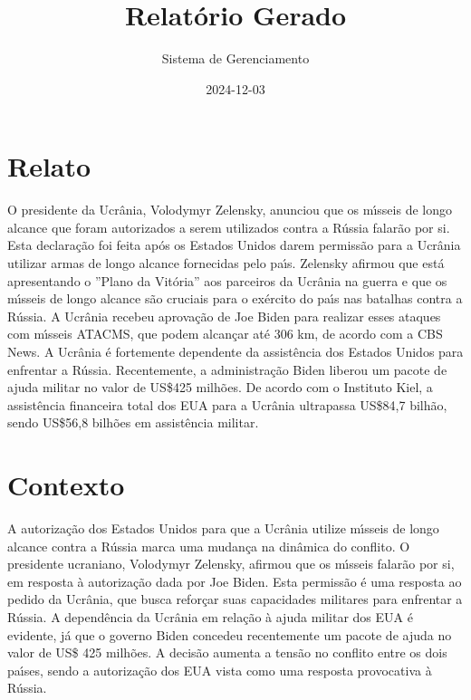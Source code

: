 \documentclass[article,11pt,oneside,a4paper,brazil,sumario=tradicional]{abntex2}%
\title{Relatório Gerado}%
\author{Sistema de Gerenciamento}%
\date{2024{-}12{-}03}%
\begin{document}
%
\normalsize%
\maketitle%
%
\frenchspacing%
\section{Relato}%
\label{sec:Relato}%
O presidente da Ucr\^ania, Volodymyr Zelensky, anunciou que os m{\'\i}sseis de longo alcance que foram autorizados a serem utilizados contra a R\'ussia falar\~ao por si. Esta declara\c{c}\~ao foi feita ap\'os os Estados Unidos darem permiss\~ao para a Ucr\^ania utilizar armas de longo alcance fornecidas pelo pa{\'\i}s. Zelensky afirmou que est\'a apresentando o ''Plano da Vit\'oria'' aos parceiros da Ucr\^ania na guerra e que os m{\'\i}sseis de longo alcance s\~ao cruciais para o ex\'ercito do pa{\'\i}s nas batalhas contra a R\'ussia. A Ucr\^ania recebeu aprova\c{c}\~ao de Joe Biden para realizar esses ataques com m{\'\i}sseis ATACMS, que podem alcan\c{c}ar at\'e 306 km, de acordo com a CBS News. A Ucr\^ania \'e fortemente dependente da assist\^encia dos Estados Unidos para enfrentar a R\'ussia. Recentemente, a administra\c{c}\~ao Biden liberou um pacote de ajuda militar no valor de US\$425 milh\~oes. De acordo com o Instituto Kiel, a assist\^encia financeira total dos EUA para a Ucr\^ania ultrapassa US\$84,7 bilh\~ao, sendo US\$56,8 bilh\~oes em assist\^encia militar.

%
\section{Contexto}%
\label{sec:Contexto}%
A autoriza\c{c}\~ao dos Estados Unidos para que a Ucr\^ania utilize m{\'\i}sseis de longo alcance contra a R\'ussia marca uma mudan\c{c}a na din\^amica do conflito. O presidente ucraniano, Volodymyr Zelensky, afirmou que os m{\'\i}sseis falar\~ao por si, em resposta \`a autoriza\c{c}\~ao dada por Joe Biden. Esta permiss\~ao \'e uma resposta ao pedido da Ucr\^ania, que busca refor\c{c}ar suas capacidades militares para enfrentar a R\'ussia. A depend\^encia da Ucr\^ania em rela\c{c}\~ao \`a ajuda militar dos EUA \'e evidente, j\'a que o governo Biden concedeu recentemente um pacote de ajuda no valor de US\$ 425 milh\~oes. A decis\~ao aumenta a tens\~ao no conflito entre os dois pa{\'\i}ses, sendo a autoriza\c{c}\~ao dos EUA vista como uma resposta provocativa \`a R\'ussia.

%
\end{document}
